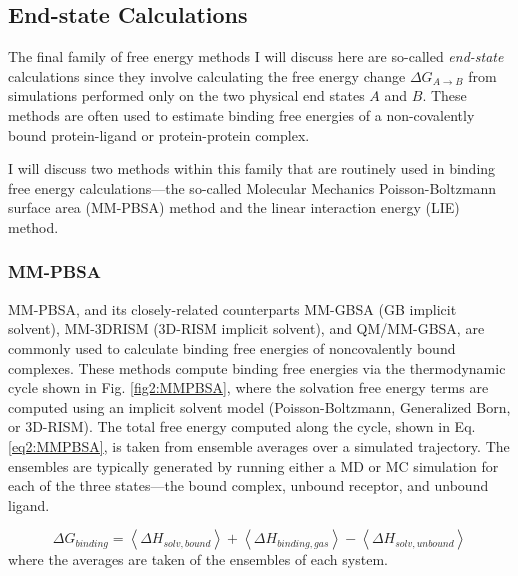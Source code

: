 \subsection{End-state Calculations}
\label{sec1:EndState}

The final family of free energy methods I will discuss here are so-called
\emph{end-state} calculations since they involve calculating the free energy
change $\Delta G_{A \rightarrow B}$ from simulations performed only on the two
physical end states $A$ and $B$. These methods are often used to estimate
binding free energies of a non-covalently bound protein-ligand or
protein-protein complex. \cite{Massova1999, Gohlke2003, Gohlke2004, Homeyer2012,
MMPBSApy}

I will discuss two methods within this family that are routinely used in binding
free energy calculations---the so-called Molecular Mechanics Poisson-Boltzmann
surface area (MM-PBSA) method \cite{Srinivasan_JAmChemSoc_1998_v120_p9401,
Massova2000} and the linear interaction energy (LIE) method.
\cite{Aqvist_ProteinEng_1994_v7_p385, Hansson1998}

\subsubsection{MM-PBSA}
\label{sec1:MMPBSA}

MM-PBSA, and its closely-related counterparts MM-GBSA (GB implicit solvent),
MM-3DRISM (3D-RISM implicit solvent), and QM/MM-GBSA, are commonly used to
calculate binding free energies of noncovalently bound complexes. These methods
compute binding free energies via the thermodynamic cycle shown in Fig.
\ref{fig2:MMPBSA}, where the solvation free energy terms are computed using an
implicit solvent model (\eg Poisson-Boltzmann, Generalized Born, or 3D-RISM).
The total free energy computed along the cycle, shown in Eq. \ref{eq2:MMPBSA},
is taken from ensemble averages over a simulated trajectory. The ensembles are
typically generated by running either a MD or MC simulation for each of the
three states---the bound complex, unbound receptor, and unbound ligand.
\cite{MMPBSApy}

\begin{equation}
   \Delta G_{binding} = \left \langle \Delta H_{solv,bound} \right \rangle +
      \left \langle \Delta H_{binding,gas} \right \rangle - \left \langle \Delta
      H_{solv, unbound} \right \rangle
   \label{eq2:MMPBSA}
\end{equation}
where the averages are taken of the ensembles of each system.

